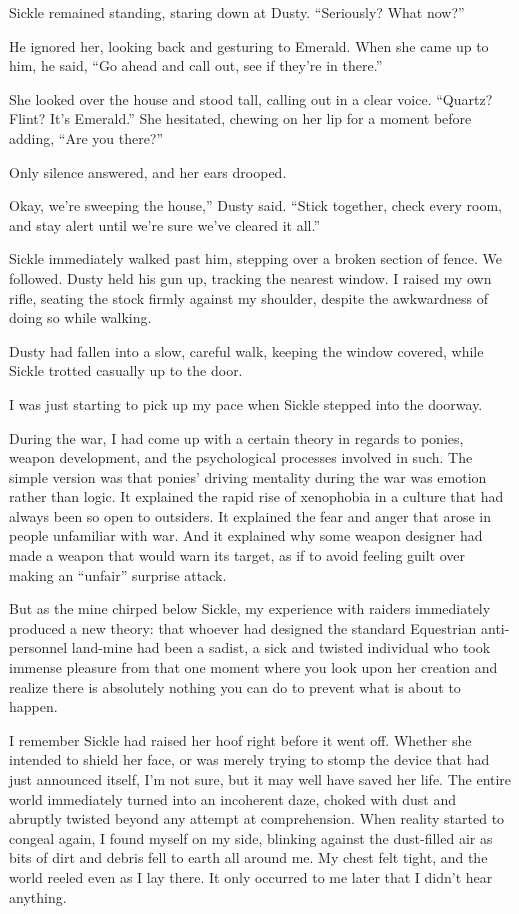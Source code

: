 Sickle remained standing, staring down at Dusty. “Seriously? What now?”

He ignored her, looking back and gesturing to Emerald. When she came up to him, he said, “Go ahead and call out, see if they’re in there.”

She looked over the house and stood tall, calling out in a clear voice. “Quartz? Flint? It’s Emerald.” She hesitated, chewing on her lip for a moment before adding, “Are you there?”

Only silence answered, and her ears drooped.

\leavevmode{}Okay, we’re sweeping the house,” Dusty said. “Stick together, check every room, and stay alert until we’re sure we’ve cleared it all.”

Sickle immediately walked past him, stepping over a broken section of fence. We followed. Dusty held his gun up, tracking the nearest window. I raised my own rifle, seating the stock firmly against my shoulder, despite the awkwardness of doing so while walking.

Dusty had fallen into a slow, careful walk, keeping the window covered, while Sickle trotted casually up to the door.

I was just starting to pick up my pace when Sickle stepped into the doorway.

During the war, I had come up with a certain theory in regards to ponies, weapon development, and the psychological processes involved in such. The simple version was that ponies’ driving mentality during the war was emotion rather than logic. It explained the rapid rise of xenophobia in a culture that had always been so open to outsiders. It explained the fear and anger that arose in people unfamiliar with war. And it explained why some weapon designer had made a weapon that would warn its target, as if to avoid feeling guilt over making an “unfair” surprise attack.

But as the mine chirped below Sickle, my experience with raiders immediately produced a new theory: that whoever had designed the standard Equestrian anti-personnel land-mine had been a sadist, a sick and twisted individual who took immense pleasure from that one moment where you look upon her creation and realize there is absolutely nothing you can do to prevent what is about to happen.

I remember Sickle had raised her hoof right before it went off. Whether she intended to shield her face, or was merely trying to stomp the device that had just announced itself, I’m not sure, but it may well have saved her life. The entire world immediately turned into an incoherent daze, choked with dust and abruptly twisted beyond any attempt at comprehension. When reality started to congeal again, I found myself on my side, blinking against the dust-filled air as bits of dirt and debris fell to earth all around me. My chest felt tight, and the world reeled even as I lay there. It only occurred to me later that I didn’t hear anything.

